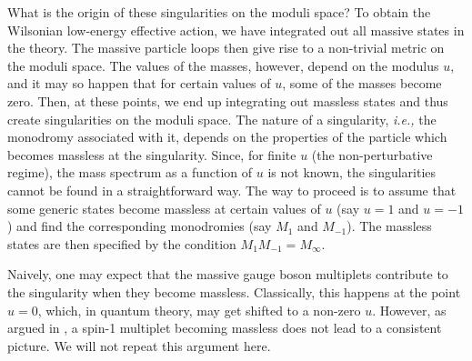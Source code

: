 What is the origin of these singularities on the moduli space? To
obtain the Wilsonian low-energy effective action, we have integrated
out all massive states in the theory. The massive particle loops then
give rise to a non-trivial metric on the moduli space. The values of
the masses, however, depend on the modulus $u$, and it may so happen
that for certain values of $u$, some of the masses become zero. Then,
at these points, we end up integrating out massless states and thus
create singularities on the moduli space. The nature of a singularity,
{\it i.e.,} the monodromy associated with it, depends on the
properties of the particle which becomes massless at the singularity.
Since, for finite $u$ (the non-perturbative regime), the mass spectrum
as a function of $u$ is not known, the singularities cannot be found
in a straightforward way. The way to proceed is to assume that some 
generic states become massless at certain values of $u$ (say $u=1$ and
$u=-1$) and find the corresponding monodromies (say $M_1$ and
$M_{-1}$). The massless states are then specified by the condition  
$M_1 M_{-1}=M_\infty$.

Naively, one may expect that the massive gauge boson multiplets
contribute to the singularity when they become massless. Classically,
this happens at the point $u=0$, which, in quantum theory, may
get shifted to a non-zero $u$. However, as argued in \cite{SW-I}, a
spin-1 multiplet becoming massless does not lead to a consistent
picture. We will not repeat this argument here.  

